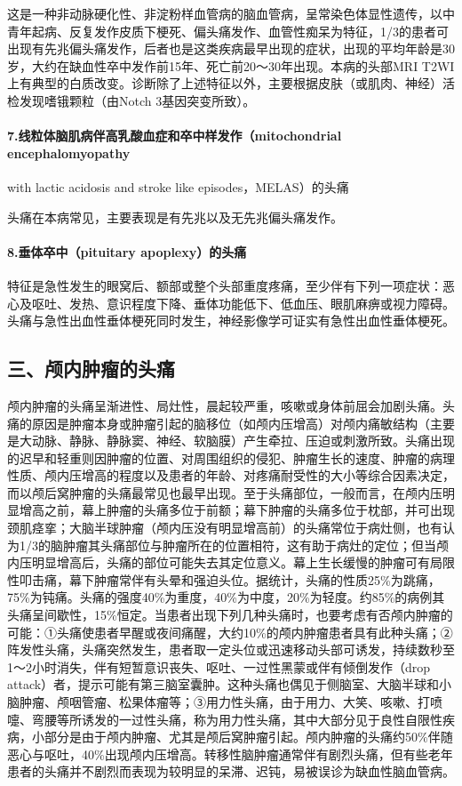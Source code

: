 这是一种非动脉硬化性、非淀粉样血管病的脑血管病，呈常染色体显性遗传，以中青年起病、反复发作皮质下梗死、偏头痛发作、血管性痴呆为特征，1/3的患者可出现有先兆偏头痛发作，后者也是这类疾病最早出现的症状，出现的平均年龄是30岁，大约在缺血性卒中发作前15年、死亡前20～30年出现。本病的头部MRI
T2WI上有典型的白质改变。诊断除了上述特征以外，主要根据皮肤（或肌肉、神经）活检发现嗜锇颗粒（由Notch
3基因突变所致）。

\paragraph{7.线粒体脑肌病伴高乳酸血症和卒中样发作（mitochondrial encephalomyopathy}
with lactic acidosis and stroke like episodes，MELAS）的头痛

头痛在本病常见，主要表现是有先兆以及无先兆偏头痛发作。

\paragraph{8.垂体卒中（pituitary apoplexy）的头痛}

特征是急性发生的眼窝后、额部或整个头部重度疼痛，至少伴有下列一项症状：恶心及呕吐、发热、意识程度下降、垂体功能低下、低血压、眼肌麻痹或视力障碍。头痛与急性出血性垂体梗死同时发生，神经影像学可证实有急性出血性垂体梗死。

\subsection{三、颅内肿瘤的头痛}

颅内肿瘤的头痛呈渐进性、局灶性，晨起较严重，咳嗽或身体前屈会加剧头痛。头痛的原因是肿瘤本身或肿瘤引起的脑移位（如颅内压增高）对颅内痛敏结构（主要是大动脉、静脉、静脉窦、神经、软脑膜）产生牵拉、压迫或刺激所致。头痛出现的迟早和轻重则因肿瘤的位置、对周围组织的侵犯、肿瘤生长的速度、肿瘤的病理性质、颅内压增高的程度以及患者的年龄、对疼痛耐受性的大小等综合因素决定，而以颅后窝肿瘤的头痛最常见也最早出现。至于头痛部位，一般而言，在颅内压明显增高之前，幕上肿瘤的头痛多位于前额；幕下肿瘤的头痛多位于枕部，并可出现颈肌痉挛；大脑半球肿瘤（颅内压没有明显增高前）的头痛常位于病灶侧，也有认为1/3的脑肿瘤其头痛部位与肿瘤所在的位置相符，这有助于病灶的定位；但当颅内压明显增高后，头痛的部位可能失去其定位意义。幕上生长缓慢的肿瘤可有局限性叩击痛，幕下肿瘤常伴有头晕和强迫头位。据统计，头痛的性质25\%为跳痛，75\%为钝痛。头痛的强度40\%为重度，40\%为中度，20\%为轻度。约85\%的病例其头痛呈间歇性，15\%恒定。当患者出现下列几种头痛时，也要考虑有否颅内肿瘤的可能：①头痛使患者早醒或夜间痛醒，大约10\%的颅内肿瘤患者具有此种头痛；②阵发性头痛，头痛突然发生，患者取一定头位或迅速移动头部可诱发，持续数秒至1～2小时消失，伴有短暂意识丧失、呕吐、一过性黑蒙或伴有倾倒发作（drop
attack）者，提示可能有第三脑室囊肿。这种头痛也偶见于侧脑室、大脑半球和小脑肿瘤、颅咽管瘤、松果体瘤等；③用力性头痛，由于用力、大笑、咳嗽、打喷嚏、弯腰等所诱发的一过性头痛，称为用力性头痛，其中大部分见于良性自限性疾病，小部分是由于颅内肿瘤、尤其是颅后窝肿瘤引起。颅内肿瘤的头痛约50\%伴随恶心与呕吐，40\%出现颅内压增高。转移性脑肿瘤通常伴有剧烈头痛，但有些老年患者的头痛并不剧烈而表现为较明显的呆滞、迟钝，易被误诊为缺血性脑血管病。

